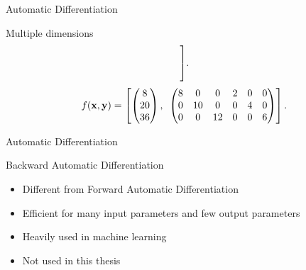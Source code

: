\begin{frame}{Automatic Differentiation}
\begin{block}{Multiple dimensions}
\begin{align*}
{            }\Vast].
        \end{align*}
        \pause
        \vspace{-1em}
        \begin{align*}
            f(\textbf{x},\textbf{y}) = \left[
            \begin{pmatrix}
            8\\20\\36
            \end{pmatrix}
            ,\hspace{0.5em}
            \begin{pmatrix}
            8&0&0&2&0&0\\
            0&10&0&0&4&0\\
            0&0&12&0&0&6
            \end{pmatrix}
            \right].
        \end{align*}
    \end{block}
\end{frame}
\begin{frame}{Automatic Differentiation}
    \begin{block}{Backward Automatic Differentiation}
        \centering
            \begin{itemize}
                \item Different from Forward Automatic Differentiation
                \item Efficient for many input parameters and few output parameters
                \item Heavily used in machine learning
                \item Not used in this thesis
            \end{itemize}
    \end{block}
\end{frame}
